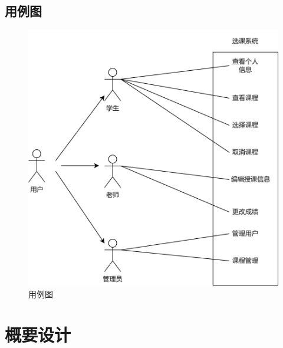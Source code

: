 \documentclass[12pt, a4paper]{article}
\begin{document}
\subsection{用例图}
\begin{figure}[H]
  \centering
  \includegraphics[width = 0.8 \textwidth]{usecase.png}
  \caption{用例图}
\end{figure}

\section{概要设计}
\end{document}
